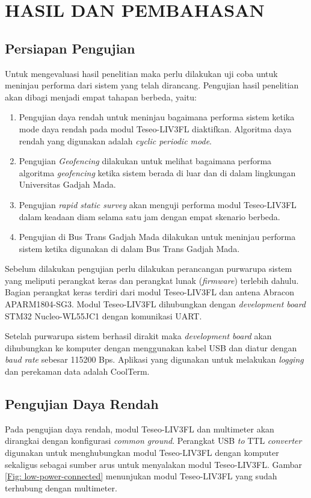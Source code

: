 \chapter{HASIL DAN PEMBAHASAN}

\section{Persiapan Pengujian}
Untuk mengevaluasi hasil penelitian maka perlu dilakukan uji coba untuk meninjau performa dari sistem yang telah dirancang. Pengujian hasil penelitian akan dibagi menjadi empat tahapan berbeda, yaitu:

\begin{enumerate}
	\item Pengujian daya rendah untuk meninjau bagaimana performa sistem ketika mode daya rendah pada modul Teseo-LIV3FL diaktifkan. Algoritma daya rendah yang digunakan adalah \textit{cyclic periodic mode}.
	\item Pengujian \textit{Geofencing} dilakukan untuk melihat bagaimana performa algoritma \textit{geofencing} ketika sistem berada di luar dan di dalam lingkungan Universitas Gadjah Mada.
	\item Pengujian \textit{rapid static survey} akan menguji performa modul Teseo-LIV3FL dalam keadaan diam selama satu jam dengan empat skenario berbeda.
	\item Pengujian di Bus Trans Gadjah Mada dilakukan untuk meninjau performa sistem ketika digunakan di dalam Bus Trans Gadjah Mada.
\end{enumerate}

Sebelum dilakukan pengujian perlu dilakukan perancangan purwarupa sistem yang meliputi perangkat keras dan perangkat lunak (\textit{firmware}) terlebih dahulu. Bagian perangkat keras terdiri dari modul Teseo-LIV3FL dan antena Abracon APARM1804-SG3. Modul Teseo-LIV3FL dihubungkan dengan \textit{development board} STM32 Nucleo-WL55JC1 dengan komunikasi UART.

Setelah purwarupa sistem berhasil dirakit maka \textit{development board} akan dihubungkan ke komputer dengan menggunakan kabel USB dan diatur dengan \textit{baud rate} sebesar 115200 Bps. Aplikasi yang digunakan untuk melakukan \textit{logging} dan perekaman data adalah CoolTerm.

\section{Pengujian Daya Rendah}
Pada pengujian daya rendah, modul Teseo-LIV3FL dan multimeter akan dirangkai dengan konfigurasi \textit{common ground}. Perangkat USB \textit{to} TTL \textit{converter} digunakan untuk menghubungkan modul Teseo-LIV3FL dengan komputer sekaligus sebagai sumber arus untuk menyalakan modul Teseo-LIV3FL. Gambar \ref{Fig: low-power-connected} menunjukan modul Teseo-LIV3FL yang sudah terhubung dengan multimeter.

